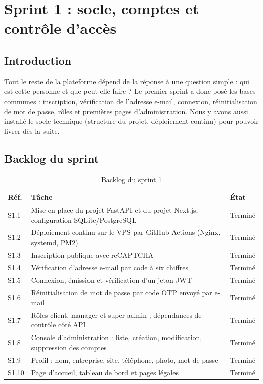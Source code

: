 \chapter{Sprint 1 : socle, comptes et contrôle d'accès}

\section{Introduction}
Tout le reste de la plateforme dépend de la réponse à une question simple : qui est cette personne et que peut-elle faire ? Le premier sprint a donc posé les bases communes : inscription, vérification de l'adresse e-mail, connexion, réinitialisation de mot de passe, rôles et premières pages d'administration. Nous y avons aussi installé le socle technique (structure du projet, déploiement continu) pour pouvoir livrer dès la suite.

\section{Backlog du sprint}
\begin{table}[htbp]
\centering
\small
\caption{Backlog du sprint 1}\label{tab-backlog-s1}
\begin{tabularx}{\textwidth}{@{}lXl@{}}
\toprule
\textbf{Réf.} & \textbf{Tâche} & \textbf{État}\\
\midrule
S1.1 & Mise en place du projet FastAPI et du projet Next.js, configuration SQLite/PostgreSQL & Terminé\\
S1.2 & Déploiement continu sur le VPS par GitHub Actions (Nginx, systemd, PM2) & Terminé\\
S1.3 & Inscription publique avec reCAPTCHA & Terminé\\
S1.4 & Vérification d'adresse e-mail par code à six chiffres & Terminé\\
S1.5 & Connexion, émission et vérification d'un jeton JWT & Terminé\\
S1.6 & Réinitialisation de mot de passe par code OTP envoyé par e-mail & Terminé\\
S1.7 & Rôles client, manager et super admin ; dépendances de contrôle côté API & Terminé\\
S1.8 & Console d'administration : liste, création, modification, suppression des comptes & Terminé\\
S1.9 & Profil : nom, entreprise, site, téléphone, photo, mot de passe & Terminé\\
S1.10 & Page d'accueil, tableau de bord et pages légales & Terminé\\
\bottomrule
\end{tabularx}
\end{table}

